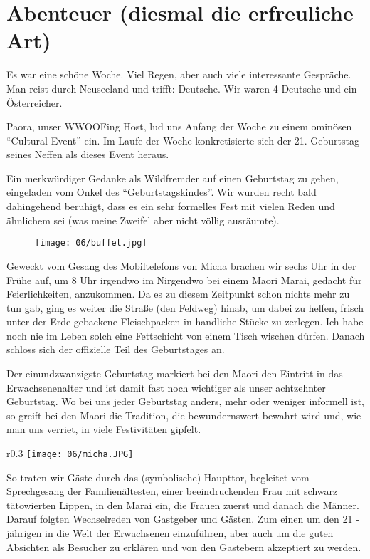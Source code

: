 \chapter{Abenteuer (diesmal die erfreuliche Art)}

Es war eine schöne Woche. Viel Regen, aber auch viele interessante
Gespräche. Man reist durch Neuseeland und trifft: Deutsche. Wir waren 4
Deutsche und ein Österreicher.

Paora, unser WWOOFing Host, lud uns Anfang der Woche zu einem ominösen
``Cultural Event'' ein. Im Laufe der Woche konkretisierte sich der
21. Geburtstag seines Neffen als dieses Event heraus.

Ein merkwürdiger Gedanke als Wildfremder auf einen Geburtstag zu
gehen, eingeladen vom Onkel des ``Geburtstagskindes''. Wir wurden recht
bald dahingehend beruhigt, dass es ein sehr formelles Fest mit vielen
Reden und ähnlichem sei (was meine Zweifel aber nicht völlig
ausräumte).

\begin{figure}[h]
  \centering
  \texttt{[image: 06/buffet.jpg]}
\end{figure}
Geweckt vom Gesang des Mobiltelefons von Micha brachen wir sechs Uhr
in der Frühe auf, um 8 Uhr irgendwo im Nirgendwo bei einem Maori
Marai, gedacht für Feierlichkeiten, anzukommen. Da es zu diesem
Zeitpunkt schon nichts mehr zu tun gab, ging es weiter die Straße (den
Feldweg) hinab, um dabei zu helfen, frisch unter der Erde gebackene
Fleischpacken in handliche Stücke zu zerlegen. Ich habe noch nie im
Leben solch eine Fettschicht von einem Tisch wischen dürfen. Danach
schloss sich der offizielle Teil des Geburtstages an.

Der einundzwanzigste Geburtstag markiert bei den Maori den Eintritt in
das Erwachsenenalter und ist damit fast noch wichtiger als unser
achtzehnter Geburtstag. Wo bei uns jeder Geburtstag anders, mehr oder
weniger informell ist, so greift bei den Maori die Tradition, die
bewundernswert bewahrt wird und, wie man uns verriet, in viele
Festivitäten gipfelt.

\begin{wrapfigure}[14]{r}{0.3\textwidth}
  \centering
  \texttt{[image: 06/micha.JPG]}
\end{wrapfigure}
So traten wir Gäste durch das (symbolische) Haupttor, begleitet vom
Sprechgesang der Familienältesten, einer beeindruckenden Frau mit
schwarz tätowierten Lippen, in den Marai ein, die Frauen zuerst und
danach die Männer. Darauf folgten Wechselreden von Gastgeber und
Gästen. Zum einen um den 21 -jährigen in die Welt der Erwachsenen
einzuführen, aber auch um die guten Absichten als Besucher zu erklären
und von den Gastebern akzeptiert zu werden.

